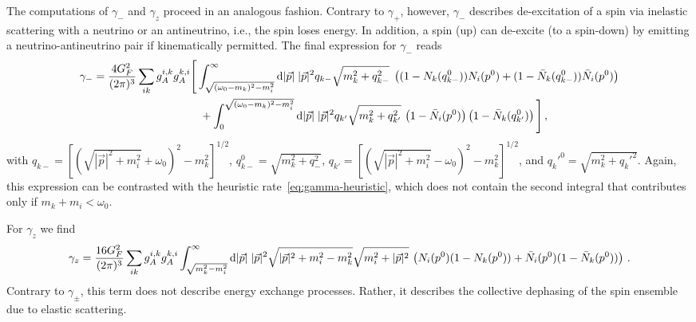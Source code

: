 \documentclass[aps,prd,10pt,twocolumn,superscriptaddress,floatfix,nofootinbib,amsmath,amssymb,altaffilletter,preprintnumbers]{revtex4-1}
\begin{document}
The computations of $\gamma_{-}$ and $\gamma_z$ proceed in an analogous fashion. Contrary to $\gamma_+$, however, $\gamma_-$ describes de-excitation of a spin via 
inelastic scattering with a neutrino or an antineutrino, i.e., the spin loses energy.  In addition, a spin (up) can de-excite (to a spin-down) by emitting a neutrino-antineutrino pair if kinematically permitted. 
The final expression for $\gamma_-$ reads
\begin{equation}
\begin{aligned}
\gamma_{-}= &\; \frac{4G_F^2}{(2 \pi)^3} \sum_{ik} g_A^{i,k} g_A^{k,i}  \Bigg[
    \int_{\sqrt{(\omega_0-m_k)^2-m_i^2}}^\infty {\rm d}|\vec{p}| \; |\vec{p}|^2q_{k-}\sqrt{m_k^2+q_{k-}^2}\; \left((1- N_k(q_{k-}^0))N_i(p^0)+(1- \bar{N}_k(q_{k-}^0))\bar{N}_i(p^0)\right) \\
    &\hspace{30mm}+ \int_0^{\sqrt{(\omega_0-m_k)^2-m_i^2}} {\rm d} |\vec{p}|\; |\vec{p}|^2q_{k'}\sqrt{m_k^2+q_{k'}^2} \,  \left(1-\bar{N}_i(p^0)\right) \left(1-\bar{N}_k(q_{k'}^0)\right) \Bigg]\,,
    \label{exp4}
\end{aligned}
\end{equation}
with $q_{k-}=[(\sqrt{|\vec{p}|^2+m_i^2}+\omega_0)^2-m_k^2]^{1/2}$, $q_{k-}^0=\sqrt{m_k^2+q_{-}^2}$, $q_{k'}=[(\sqrt{|\vec{p}|^2+m_i^2}-\omega_0)^2-m_k^2]^{1/2}$, and $q_k'^0=\sqrt{m_k^2+q_k'^2}$. Again, this expression can be contrasted with the heuristic rate~\eqref{eq:gamma-heuristic}, which does not contain the second integral that contributes only if $m_k+m_i<\omega_0$.  


For $\gamma_{z}$ we find
\begin{equation}
   \gamma_{z}=\frac{16G_F^2}{(2 \pi)^3} \sum_{ik} g_A^{i,k} g_A^{k,i}  \int_{\sqrt{m_k^2-m_i^2}}^\infty {\rm d} |\vec{p}|\; |\vec{p}|^2\sqrt{|\vec{p}|^2+m_i^2-m_k^2}\sqrt{m_i^2+|\vec{p}|^2}\, \left(N_i(p^0)(1-N_k(p^0))+\bar{N}_i(p^0)(1-\bar{N}_k(p^0))\right)\,.
   \label{eq:gammaz}
\end{equation}
Contrary to $\gamma_\pm$, this term does not describe energy exchange processes.  Rather, it describes the collective dephasing of the spin ensemble due to elastic scattering.
\end{document}
